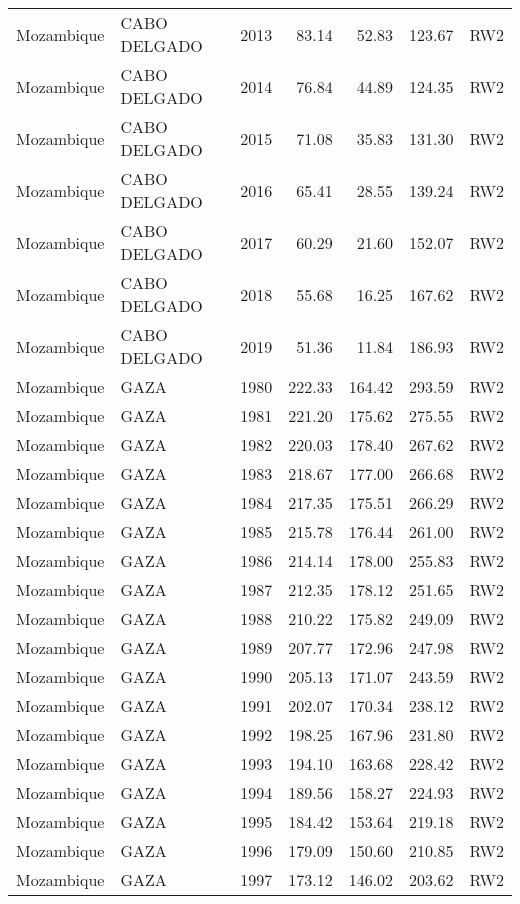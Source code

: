 \begin{longtable}{lllrrrl}
  Mozambique & CABO DELGADO & 2013 & 83.14 & 52.83 & 123.67 & RW2 \\ 
  Mozambique & CABO DELGADO & 2014 & 76.84 & 44.89 & 124.35 & RW2 \\ 
  Mozambique & CABO DELGADO & 2015 & 71.08 & 35.83 & 131.30 & RW2 \\ 
  Mozambique & CABO DELGADO & 2016 & 65.41 & 28.55 & 139.24 & RW2 \\ 
  Mozambique & CABO DELGADO & 2017 & 60.29 & 21.60 & 152.07 & RW2 \\ 
  Mozambique & CABO DELGADO & 2018 & 55.68 & 16.25 & 167.62 & RW2 \\ 
  Mozambique & CABO DELGADO & 2019 & 51.36 & 11.84 & 186.93 & RW2 \\ 
  Mozambique & GAZA & 1980 & 222.33 & 164.42 & 293.59 & RW2 \\ 
  Mozambique & GAZA & 1981 & 221.20 & 175.62 & 275.55 & RW2 \\ 
  Mozambique & GAZA & 1982 & 220.03 & 178.40 & 267.62 & RW2 \\ 
  Mozambique & GAZA & 1983 & 218.67 & 177.00 & 266.68 & RW2 \\ 
  Mozambique & GAZA & 1984 & 217.35 & 175.51 & 266.29 & RW2 \\ 
  Mozambique & GAZA & 1985 & 215.78 & 176.44 & 261.00 & RW2 \\ 
  Mozambique & GAZA & 1986 & 214.14 & 178.00 & 255.83 & RW2 \\ 
  Mozambique & GAZA & 1987 & 212.35 & 178.12 & 251.65 & RW2 \\ 
  Mozambique & GAZA & 1988 & 210.22 & 175.82 & 249.09 & RW2 \\ 
  Mozambique & GAZA & 1989 & 207.77 & 172.96 & 247.98 & RW2 \\ 
  Mozambique & GAZA & 1990 & 205.13 & 171.07 & 243.59 & RW2 \\ 
  Mozambique & GAZA & 1991 & 202.07 & 170.34 & 238.12 & RW2 \\ 
  Mozambique & GAZA & 1992 & 198.25 & 167.96 & 231.80 & RW2 \\ 
  Mozambique & GAZA & 1993 & 194.10 & 163.68 & 228.42 & RW2 \\ 
  Mozambique & GAZA & 1994 & 189.56 & 158.27 & 224.93 & RW2 \\ 
  Mozambique & GAZA & 1995 & 184.42 & 153.64 & 219.18 & RW2 \\ 
  Mozambique & GAZA & 1996 & 179.09 & 150.60 & 210.85 & RW2 \\ 
  Mozambique & GAZA & 1997 & 173.12 & 146.02 & 203.62 & RW2 \\ 

\end{longtable}
